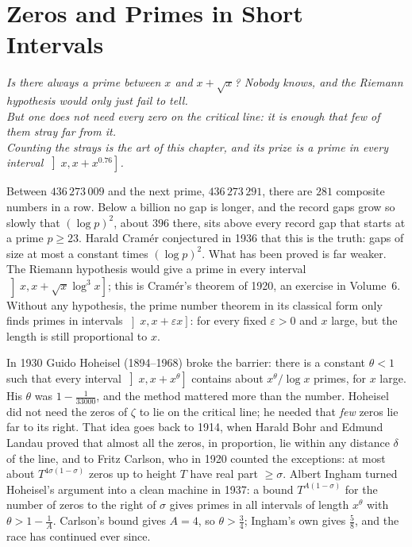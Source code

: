 \chapter{Zeros and Primes in Short Intervals}\label{ch:zeros}
\begin{center}\itshape
Is there always a prime between $x$ and $x+\sqrt x$? Nobody knows, and the Riemann hypothesis would only just fail to tell.\\
But one does not need every zero on the critical line: it is enough that few of them stray far from it.\\
Counting the strays is the art of this chapter, and its prize is a prime in every interval $\left]x,x+x^{0.76}\right]$.
\end{center}

Between $436\,273\,009$ and the next prime, $436\,273\,291$, there are $281$ composite numbers in a row. Below a billion no gap is longer, and the record gaps grow so slowly that $(\log p)^2$, about $396$ there, sits above every record gap that starts at a prime $p\ge23$. Harald Cram\'er
conjectured in 1936 that this is the truth: gaps of size at most a constant times $(\log p)^2$. What has been proved is far weaker. The Riemann hypothesis would give a prime in every interval $\left]x,x+\sqrt x\log^3x\right]$; this is Cram\'er's theorem of 1920, an exercise in Volume~6. Without
any hypothesis, the prime number theorem in its classical form only finds primes in intervals $\left]x,x+\varepsilon x\right]$: for every fixed $\varepsilon>0$ and $x$ large, but the length is still proportional to $x$.

In 1930 Guido Hoheisel (1894--1968) broke the barrier: there is a constant $\theta<1$ such that every interval $\left]x,x+x^\theta\right]$ contains about $x^\theta/\log x$ primes, for $x$ large. His $\theta$ was $1-\frac1{33000}$, and the method mattered more
than the number. Hoheisel did not need the zeros of $\zeta$ to lie on the critical line; he needed that \emph{few} zeros lie far to its right. That idea goes back to 1914, when Harald Bohr and Edmund Landau proved that almost all the zeros, in proportion, lie within any distance $\delta$
of the line, and to Fritz Carlson, who in 1920 counted the exceptions: at most about $T^{4\sigma(1-\sigma)}$ zeros up to height $T$ have real part $\ge\sigma$. Albert Ingham turned Hoheisel's argument into a clean machine in 1937: a bound $T^{A(1-\sigma)}$ for the number of zeros to the right of $\sigma$ gives primes in all intervals of length $x^\theta$ with $\theta>1-\frac1A$.
Carlson's bound gives $A=4$, so $\theta>\frac34$; Ingham's own gives $\frac58$, and the race has continued ever since.

